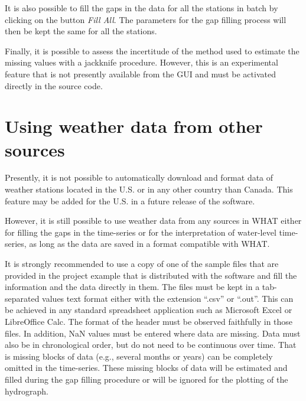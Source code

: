 \documentclass[WHATMANUAL.tex]{subfiles}
\begin{document}
It is also possible to fill the gaps in the data for all the stations in batch by clicking on the button \emph{Fill All}. The parameters for the gap filling process will then be kept the same for all the stations.

Finally, it is possible to assess the incertitude of the method used to estimate the missing values with a jackknife procedure. However, this is an experimental feature that is not presently available from the GUI and must be activated directly in the source code.

\section{Using weather data from other sources}

Presently, it is not possible to automatically download and format data of weather stations located in the U.S. or in any other country than Canada. This feature may be added for the U.S. in a future release of the software.

However, it is still possible to use weather data from any sources in WHAT either for filling the gaps in the time-series or for the interpretation of water-level time-series, as long as the data are saved in a format compatible with WHAT.

It is strongly recommended to use a copy of one of the sample files that are provided in the project example that is distributed with the software and fill the information and the data directly in them. The files must be kept in a tab-separated values text format either with the extension ``.csv'' or ``.out''. This can be achieved in any standard spreadsheet application such as Microsoft Excel or LibreOffice Calc. The format of the header must be observed faithfully in those files. In addition, NaN values must be entered where data are missing. Data must also be in chronological order, but do not need to be continuous over time. That is missing blocks of data (e.g., several months or years) can be completely omitted in the time-series. These missing blocks of data will be estimated and filled during the gap filling procedure or will be ignored for the plotting of the hydrograph.
\end{document}
